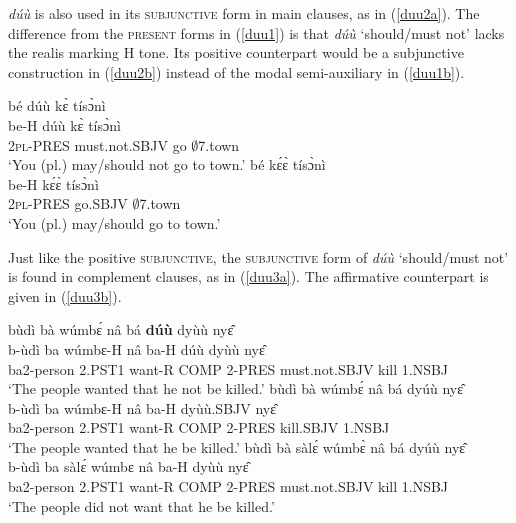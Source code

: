{\itshape dúù} is also used in its  \textsc{subjunctive} form in main clauses, as in (\ref{duu2a}). The difference from the \textsc{present} forms in (\ref{duu1}) is that {\itshape dúù} `should/must not' lacks the realis marking H tone. Its positive counterpart would be a subjunctive construction in (\ref{duu2b}) instead of the modal semi-auxiliary in (\ref{duu1b}).

\begin{exe} 
\ex \label{duu2}
\begin{xlist}
\ex\label{duu2a}
  \glll bé dúù kɛ̀ tísɔ̀nì \\
      be-H dúù kɛ̀ tísɔ̀nì \\
        2\textsc{pl}-PRES must.not.SBJV go $\emptyset$7.town \\
    \trans `You (pl.) may/should not go to town.'
\ex\label{duu2b}
  \glll bé kɛ́ɛ̀ tísɔ̀nì \\
      be-H kɛ́ɛ̀ tísɔ̀nì \\
        2\textsc{pl}-PRES go.SBJV $\emptyset$7.town \\
    \trans `You (pl.) may/should go to town.'
\end{xlist}
\end{exe}

Just like the positive \textsc{subjunctive}, the \textsc{subjunctive} form of {\itshape dúù} `should/must not' is found in complement clauses, as in (\ref{duu3a}). The affirmative counterpart is given in (\ref{duu3b}).

\begin{exe} 
\ex\label{duu3}
\begin{xlist}
\ex\label{duu3a}
  \glll bùdì bà wúmbɛ́ nâ bá {\bfseries dúù} dyùù nyɛ̂\\
         b-ùdì ba wúmbɛ-H nâ ba-H dúù dyùù nyɛ̂ \\
       ba2-person 2.PST1 want-R COMP 2-PRES must.not.SBJV kill  1.NSBJ \\
    \trans `The people wanted that he not be killed.'
\ex\label{duu3b}
  \glll bùdì bà wúmbɛ́ nâ bá dyúù nyɛ̂\\
         b-ùdì ba wúmbɛ-H nâ ba-H dyùù.SBJV nyɛ̂ \\
       ba2-person 2.PST1 want-R COMP 2-PRES kill.SBJV 1.NSBJ \\
    \trans `The people wanted that he be killed.'
\ex\label{duu3c}
  \glll bùdì bà sàlɛ́ wúmbɛ̀ nâ bá dyúù nyɛ̂\\
         b-ùdì ba sàlɛ́ wúmbɛ nâ ba-H dyùù nyɛ̂ \\
       ba2-person 2.PST1 want-R COMP 2-PRES must.not.SBJV kill 1.NSBJ \\
    \trans `The people did not want that he be killed.'
\end{xlist}
\end{exe}

